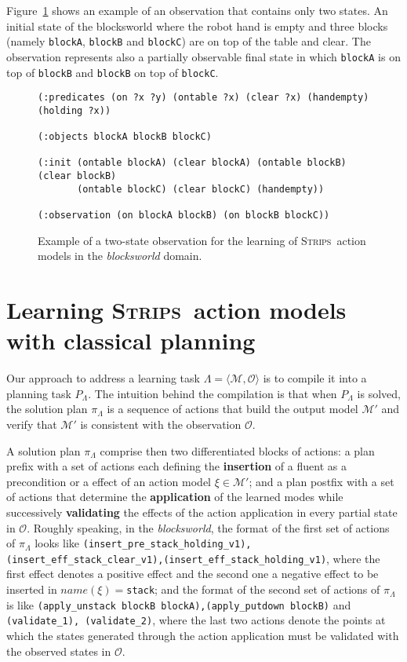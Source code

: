 \documentclass[runningheads]{llncs}
\newcommand{\tup}[1]{{\langle #1 \rangle}}
\newcommand{\strips}{\textsc{Strips}}     %
\begin{document}
Figure~\ref{fig:observation} shows an example of an observation that contains only two states. An initial state of the blocksworld where the robot hand is empty and three blocks (namely {\small\tt blockA}, {\small\tt blockB} and {\small\tt blockC}) are on top of the table and clear. The observation represents also a partially observable final state in which {\tt\small{blockA}} is on top of {\tt\small{blockB}} and {\tt\small{blockB}} on top of {\tt\small{blockC}}.

\begin{figure}[hbt!]
  \begin{small}
  \begin{verbatim}
(:predicates (on ?x ?y) (ontable ?x) (clear ?x) (handempty) (holding ?x))

(:objects blockA blockB blockC)

(:init (ontable blockA) (clear blockA) (ontable blockB) (clear blockB)
       (ontable blockC) (clear blockC) (handempty))

(:observation (on blockA blockB) (on blockB blockC))
  \end{verbatim}
  \end{small}
	\caption{\small Example of a two-state observation for the learning of \strips\ action models in the {\em blocksworld} domain.}
	\label{fig:observation}
\end{figure}



\section{Learning \strips\ action models with classical planning}
Our approach to address a learning task $\Lambda=\tup{\mathcal{M},{\mathcal O}}$ is to compile it into a planning task $P_{\Lambda}$. The intuition behind the compilation is that when $P_{\Lambda}$ is solved, the solution plan $\pi_\Lambda$ is a sequence of actions that build the output model $\mathcal{M'}$ and verify that $\mathcal{M'}$ is consistent with the observation ${\mathcal O}$.

A solution plan $\pi_\Lambda$ comprise then two differentiated blocks of actions: a plan prefix with a set of actions each defining the \textbf{insertion} of a fluent as a precondition or a effect of an action model $\xi \in \mathcal{M'}$; and a plan postfix with a set of actions that determine the \textbf{application} of the learned modes while successively \textbf{validating} the effects of the action application in every partial state in ${\mathcal O}$. Roughly speaking, in the \emph{blocksworld}, the format of the first set of actions of $\pi_\Lambda$ looks like {\tt{\small (insert\_pre\_stack\_holding\_v1)}, {\tt\small (insert\_eff\_stack\_clear\_v1),(insert\_eff\_stack\_holding\_v1)}}, where the first effect denotes a positive effect and the second one a negative effect to be inserted in $name(\xi)=${\tt{\small stack}}; and the format of the second set of actions of $\pi_\Lambda$ is like {\tt{\small (apply\_unstack blockB blockA),(apply\_putdown blockB)}} and {\tt{\small (validate\_1)}, {\tt\small (validate\_2)}}, where the last two actions denote the points at which the states generated through the action application must be validated with the observed states in ${\mathcal O}$.
\end{document}
